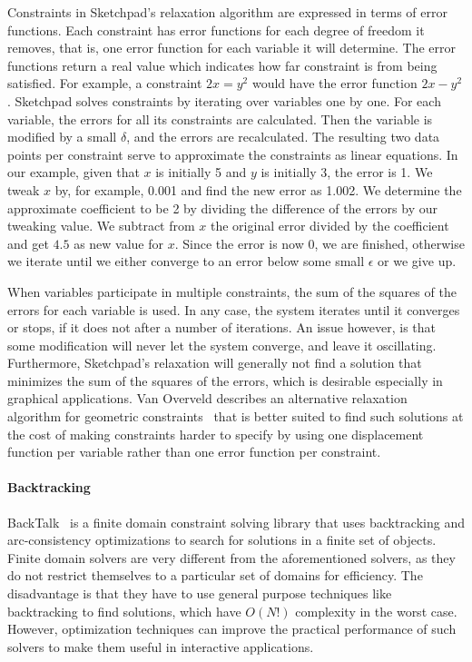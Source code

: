 Constraints in Sketchpad's relaxation algorithm are expressed in terms of error
functions. Each constraint has error functions for each degree of freedom it
removes, that is, one error function for each variable it will determine. The
error functions return a real value which indicates how far constraint is from
being satisfied. For example, a constraint $2x = y^2$ would have the error
function $2x - y^2$. Sketchpad solves constraints by iterating over variables
one by one. For each variable, the errors for all its constraints are
calculated. Then the variable is modified by a small $\delta$, and the errors
are recalculated. The resulting two data points per constraint serve to
approximate the constraints as linear equations. In our example, given that $x$
is initially 5 and $y$ is initially 3, the error is 1. We tweak $x$ by, for
example, 0.001 and find the new error as 1.002. We determine the approximate
coefficient to be 2 by dividing the difference of the errors by our tweaking
value. We subtract from $x$ the original error divided by the coefficient and
get $4.5$ as new value for $x$. Since the error is now 0, we are finished,
otherwise we iterate until we either converge to an error below some small
$\epsilon$ or we give up.

When variables participate in multiple constraints, the sum of the
squares of the errors for each variable is used. In any case, the
system iterates until it converges or stops, if it does not after a
number of iterations. An issue however, is that some modification will
never let the system converge, and leave it oscillating. Furthermore,
Sketchpad's relaxation will generally not find a solution that
minimizes the sum of the squares of the errors, which is desirable
especially in graphical applications. Van Overveld describes an
alternative relaxation algorithm for geometric constraints~\cite{van199330} that is better suited to find such solutions at the
cost of making constraints harder to specify by using one displacement
function per variable rather than one error function per constraint.

\paragraph{Backtracking}
\label{sec:backtalk}
BackTalk~\cite{pachet1995} is a finite domain constraint solving
library that uses backtracking and arc-consistency optimizations to
search for solutions in a finite set of objects. Finite domain solvers
are very different from the aforementioned solvers, as they do not
restrict themselves to a particular set of domains for efficiency. The
disadvantage is that they have to use general purpose techniques like
backtracking to find solutions, which have $O(N!)$ complexity in the
worst case. However, optimization techniques can improve the practical
performance of such solvers to make them useful in interactive
applications.

